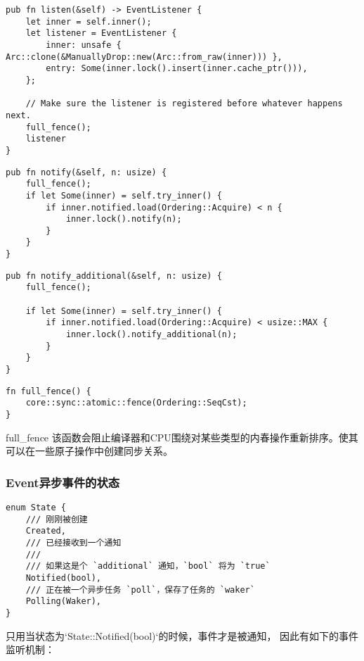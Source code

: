 \begin{lstlisting}[caption = 监听者的注册]
pub fn listen(&self) -> EventListener {
    let inner = self.inner();
    let listener = EventListener {
        inner: unsafe { Arc::clone(&ManuallyDrop::new(Arc::from_raw(inner))) },
        entry: Some(inner.lock().insert(inner.cache_ptr())),
    };

    // Make sure the listener is registered before whatever happens next.
    full_fence();
    listener
}
\end{lstlisting}

\begin{lstlisting}[caption = 通知一定数量的监听者]
pub fn notify(&self, n: usize) {
    full_fence();
    if let Some(inner) = self.try_inner() {
        if inner.notified.load(Ordering::Acquire) < n {
            inner.lock().notify(n);
        }
    }
}
\end{lstlisting}

\begin{lstlisting}[caption = 通知一定数量没有被通知的监听者]
pub fn notify_additional(&self, n: usize) {
    full_fence();

    if let Some(inner) = self.try_inner() {
        if inner.notified.load(Ordering::Acquire) < usize::MAX {
            inner.lock().notify_additional(n);
        }
    }
}
\end{lstlisting}

\begin{lstlisting}[caption=full\_fence]
fn full_fence() {
    core::sync::atomic::fence(Ordering::SeqCst);
}
\end{lstlisting}

full\_fence 该函数会阻止编译器和CPU围绕对某些类型的内春操作重新排序。使其可以在一些原子操作中创建同步关系。

\subsubsection{Event异步事件的状态}
\begin{lstlisting}[caption=Event的状态]
enum State {
    /// 刚刚被创建
    Created,
    /// 已经接收到一个通知
    ///
    /// 如果这是个 `additional` 通知，`bool` 将为 `true`
    Notified(bool),
    /// 正在被一个异步任务 `poll`，保存了任务的 `waker`
    Polling(Waker),
}
\end{lstlisting}

只用当状态为`State::Notified(bool)`的时候，事件才是被通知， 因此有如下的事件监听机制：

